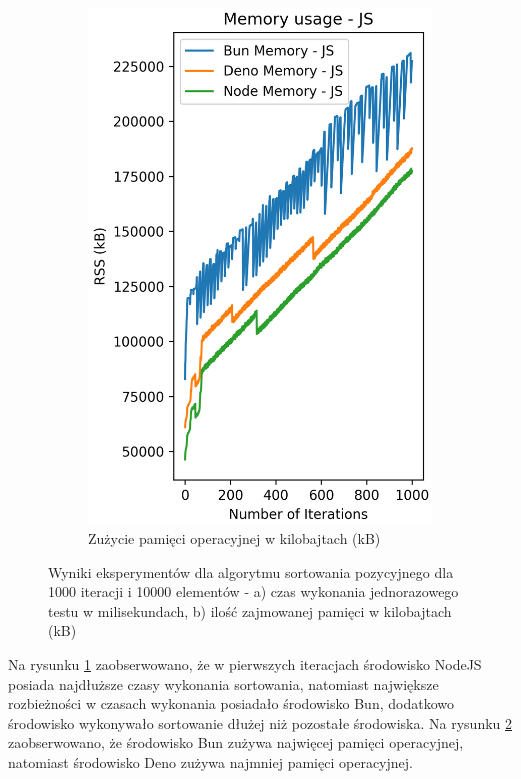 \begin{figure}[H]
\begin{subfigure}[b]{0.42\textwidth}
    \label{fig:radix_sorting_e4_time}
  \end{subfigure}
  \begin{subfigure}[b]{0.42\textwidth}
    \centering
    \includegraphics[width=\textwidth]{Figures/sorting/sorting_radix_1000_10000_js_memory.png}
    \caption{Zużycie pamięci operacyjnej w kilobajtach (kB)}
    \label{fig:radix_sorting_e4_memory}
  \end{subfigure}
  \hfill
  \caption{Wyniki eksperymentów dla algorytmu sortowania pozycyjnego dla 1000 iteracji i 10000 elementów - a) czas wykonania jednorazowego testu w milisekundach, b) ilość zajmowanej pamięci w kilobajtach (kB)}
  \label{fig:radix_sorting_e4}
\end{figure}

Na rysunku \ref{fig:radix_sorting_e4_time} zaobserwowano, że w pierwszych iteracjach środowisko NodeJS posiada najdłuższe czasy wykonania sortowania, natomiast największe rozbieżności w czasach wykonania posiadało środowisko Bun, dodatkowo środowisko wykonywało sortowanie dłużej niż pozostałe środowiska. Na rysunku \ref{fig:radix_sorting_e4_memory} zaobserwowano, że środowisko Bun zużywa najwięcej pamięci operacyjnej, natomiast środowisko Deno zużywa najmniej pamięci operacyjnej.

